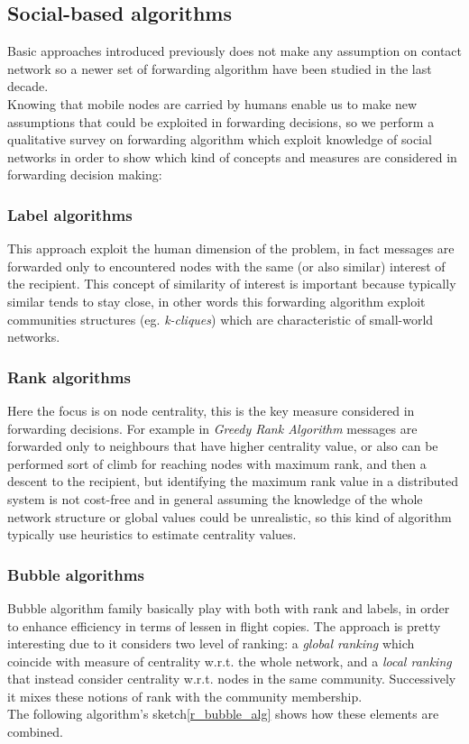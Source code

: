 \subsection{Social-based algorithms}
\label{f_social}
Basic approaches introduced previously does not make any assumption on contact network so a newer set of forwarding algorithm have been studied in the last decade. \\
Knowing that mobile nodes are carried by humans enable us to make new assumptions that could be exploited in forwarding decisions, so we perform a qualitative survey on forwarding algorithm which exploit knowledge of social networks in order to show which kind of concepts and measures are considered in forwarding decision making:

\subsubsection{Label algorithms}
This approach exploit the human dimension of the problem, in fact messages are forwarded only to encountered nodes with the same (or also similar) interest of the recipient. This concept of similarity of interest is important because typically similar tends to stay close, in other words this forwarding algorithm exploit communities structures (eg. \emph{k-cliques}) which are characteristic of small-world networks.
\subsubsection{Rank algorithms} 
Here the focus is on node centrality, this is the key measure considered in forwarding decisions. For example in \emph{Greedy Rank Algorithm} messages are forwarded only to neighbours that have higher centrality value, or also can be performed sort of climb for reaching nodes with maximum rank, and then a descent to the recipient\cite{PhysRevE.64.046135}, but identifying the maximum rank value in a distributed system is not cost-free and in general assuming the knowledge of the whole network structure or global values could be unrealistic, so this kind of algorithm typically use heuristics to estimate centrality values.

\subsubsection{Bubble algorithms}
\label{f_bubble}
Bubble algorithm\cite{bubble} family basically play with both with rank and labels, in order to enhance efficiency in terms of lessen in flight copies. The approach is pretty interesting due to it considers two level of ranking: a \emph{global ranking} which coincide with measure of centrality w.r.t. the whole network, and a \emph{local ranking} that instead consider centrality w.r.t. nodes in the same community.
Successively it mixes these notions of rank with the community membership.\\
The following algorithm's sketch\ref{r_bubble_alg} shows how these elements are combined.

